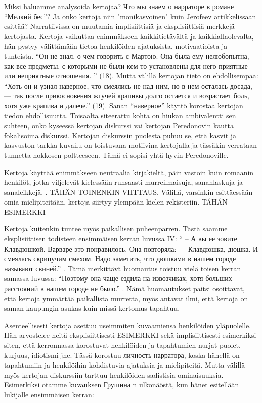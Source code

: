 \documentclass[12pt,a4paper]{article}
\begin{document}
Miksi haluamme analysoida kertojaa? 
Что мы знаем о нарраторе в романе \enquote{Мелкий бес}? Ja onko kertoja niin "monikasvoinen" kuin Jerofeev artikkelissaan esittää? Narratiivissa on muutamia implisiittisiä ja eksplisiittisiä merkkejä kertojasta. Kertoja vaikuttaa enimmäkseen kaikkitietävältä ja kaikkiallaolevalta, hän pystyy välittämään tietoa henkilöiden ajatuksista, motivaatioista ja tunteista. \enquote{Он не знал, о чем говорить с Мартою. Она была ему нелюбопытна,
как все предметы, с которыми не были кем-то установлены для него
приятные или неприятные отношения.
} (18). Mutta välillä kertojan tieto on ehdollisempaa: \enquote{Хоть он и узнал наверное, что смеялись не над ним, но в нем осталась досада, — так после прикосновения жгучей крапивы долго остается и  возрастает боль, хотя уже крапива и далече.} (19). Sanan \enquote{наверное} käyttö korostaa kertojan tiedon ehdollisuutta. Toisaalta siteerattu kohta on hiukan ambivalentti sen suhteen, onko kyseessä kertojan diskurssi vai kertojan Peredonovin kautta fokalisoima diskurssi. Kertojan diskurssin puolesta puhuu se, että kasvit ja kasvuston tarkka kuvailu on toistuvana motiivina kertojalla ja tässäkin verrataan tunnetta nokkosen poltteeseen. Tämä ei sopisi yhtä hyvin Peredonoville. 

Kertoja käyttää enimmäkseen neutraalia kirjakieltä, päin vastoin kuin romaanin henkilöt, jotka viljelevät kielessään runsaasti murreilmaisuja, sananlaskuja ja sanaleikkejä. \parencite[358--359]{connolly1981}. TÄHÄN TOINENKIN VIITTAUS. Välillä, varsinkin esittäessään omia mielipiteitään, kertoja siirtyy ylempään kielen rekisteriin. TÄHÄN ESIMERKKI

Kertoja kuitenkin tuntee myös paikallisen puheenparren. Tästä saamme eksplisiittisen todisteen ensimmäisen kerran luvussa IV: \enquote{ – А вы ее зовите Клавдюшкой.
Варваре это понравилось. Она повторяла:
— Клавдюшка, дюшка.
И смеялась скрипучим смехом. Надо заметить, что дюшками в 
нашем городе называют свиней.} \parencite[33]{sologub2004}. Tämä merkittävä huomautus toistuu vielä toisen kerran samassa luvussa: \enquote{Поэтому она чаще ездила на извозчиках,
хотя больших расстояний в нашем городе не было.} \parencite[34]{sologub2004}. Nämä huomautukset paitsi osoittavat, että kertoja ymmärtää paikallista murretta, myös antavat ilmi, että kertoja on saman kaupungin asukas kuin missä kertomus tapahtuu.

Asenteellisesti kertoja asettuu useimmiten kuvaamiensa henkilöiden yläpuolelle. Hän arvostelee heitä eksplisiittisesti ESIMERKKI sekä implisiittisesti esimerkiksi siten, että kerronnassa korostuvat henkilöiden ja tapahtumien nurjat puolet, kurjuus, idiotismi jne. 
Tässä korostuu личность нарратора, koska hänellä on tapahtumiin ja henkilöihin kohdistuvia ajatuksia ja mielipiteitä. Mutta välillä myös kertojan diskurssiin tarttuu henkilöiden sadistisia ominaisuuksia. Esimerkiksi otamme kuvauksen Грушина n ulkonäöstä, kun hänet esitellään lukijalle ensimmäisen kerran:
\end{document}
